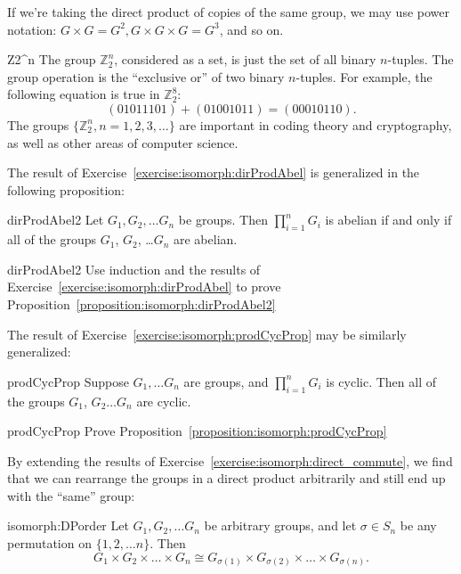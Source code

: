 If  we're taking the direct product of copies of the same group, we may use power notation: $G \times G = G^2,  G \times G \times G = G^3$, and so on.
 
\begin{example}{Z2^n}
The group ${\mathbb Z}_2^n$, considered as a set, is just the set of all
binary $n$-tuples. The group operation is the ``exclusive or'' of two
binary $n$-tuples. For example, the following equation is true in ${\mathbb Z}_2^8$:
\[
(01011101) + (01001011) = (00010110).
\]
The groups $\{ {\mathbb Z}_2^n, n=1,2,3,\ldots\}$  are important in coding theory and cryptography, as well as other 
areas of computer science.  
\end{example}

The result of Exercise~\ref{exercise:isomorph:dirProdAbel} is generalized in the following proposition:

\begin{prop}{dirProdAbel2}
Let $G_1, G_2, \ldots G_n$ be groups.  Then $\prod_{i = 1}^n G_i$ is abelian if and only if all of the groups $G_1$, $G_2$, \ldots $G_n$ are abelian.  
\end{prop}
 
\begin{exercise}{dirProdAbel2}
Use induction and the results of Exercise~\ref{exercise:isomorph:dirProdAbel} to prove Proposition~\ref{proposition:isomorph:dirProdAbel2}
\end{exercise}


The result of Exercise~\ref{exercise:isomorph:prodCycProp} may be similarly generalized:

\begin{prop}{prodCycProp}
Suppose $G_1, \ldots G_n$ are groups, and $\prod_{i = 1}^n G_i$ is cyclic. Then all of the groups $G_1$, $G_2 \ldots G_n$ are cyclic. 
\end{prop}	
 
\begin{exercise}{prodCycProp}
Prove Proposition~\ref{proposition:isomorph:prodCycProp}
\end{exercise}


By extending the results of Exercise~\ref{exercise:isomorph:direct_commute}, we find that we can rearrange the groups in a direct product arbitrarily and still end up with the ``same'' group:

\begin{prop}{isomorph:DPorder}
Let $G_1,G_2, \ldots G_n$ be arbitrary groups, and let  $\sigma \in S_n$ be any permutation on $\{1,2,\ldots n\}$. Then
\[ G_1 \times G_2 \times \ldots \times G_n \cong G_{\sigma(1)} \times G_{\sigma(2)} \times \ldots \times G_{\sigma(n)}.\]
\end{prop}

